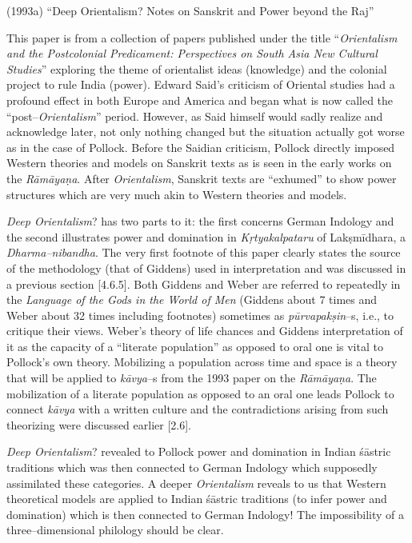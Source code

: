 (1993a) “Deep Orientalism? Notes on Sanskrit and Power beyond the Raj”


This paper is from a collection of papers published under the title “\textit{Orientalism and the Postcolonial Predicament: Perspectives on South Asia New Cultural Studies}” exploring the theme of orientalist ideas (knowledge) and the colonial project to rule India (power). Edward Said’s criticism of Oriental studies had a profound effect in both Europe and America and began what is now called the “post–\textit{Orientalism}” period. However, as Said himself would sadly realize and acknowledge later, not only nothing changed but the situation actually got worse as in the case of Pollock. Before the Saidian criticism, Pollock directly imposed Western theories and models on Sanskrit texts as is seen in the early works on the \textit{Rāmāyaṇa}. After \textit{Orientalism}, Sanskrit texts are “exhumed” to show power structures which are very much akin to Western theories and models.

\textit{Deep Orientalism}? has two parts to it: the first concerns German Indology and the second illustrates power and domination in \textit{Kṛtyakalpataru} of Lakṣmīdhara, a \textit{Dharma–nibandha}. The very first footnote of this paper clearly states the source of the methodology (that of Giddens) used in interpretation and was discussed in a previous section [4.6.5]. Both Giddens and Weber are referred to repeatedly in the \textit{Language of the Gods in the World of Men }(Giddens about 7 times and Weber about 32 times including footnotes) sometimes as \textit{pūrvapakṣin}–s, i.e., to critique their views. Weber’s theory of life chances and Giddens interpretation of it as the capacity of a “literate population” as opposed to oral one is vital to Pollock’s own theory. Mobilizing a population across time and space is a theory that will be applied to \textit{kāvya}–s from the 1993 paper on the\textit{ Rāmāyaṇa}. The mobilization of a literate population as opposed to an oral one leads Pollock to connect \textit{kāvya} with a written culture and the contradictions arising from such theorizing were discussed earlier [2.6].

\textit{Deep Orientalism}? revealed to Pollock power and domination in Indian śāstric traditions which was then connected to German Indology which supposedly assimilated these categories. A deeper\textit{ Orientalism} reveals to us that Western theoretical models are applied to Indian śāstric traditions (to infer power and domination) which is then connected to German Indology! The impossibility of a three–dimensional philology should be clear.

